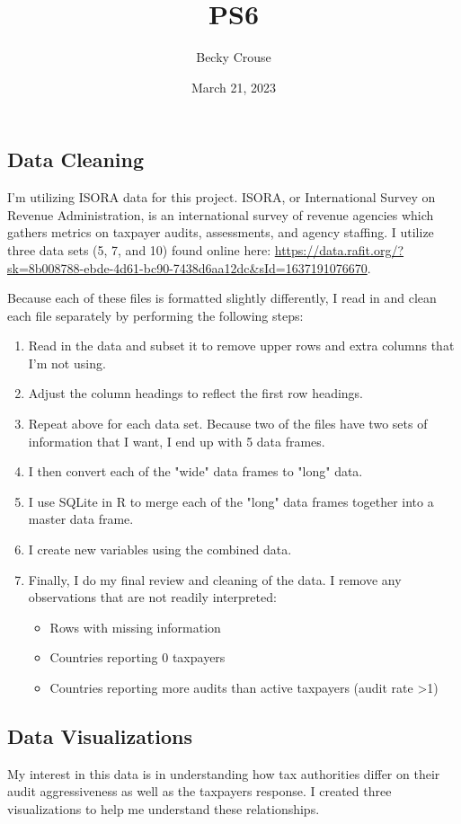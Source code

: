 \documentclass[nobib]{MSword}
\title{PS6}
\author{Becky Crouse}
\date{March 21, 2023}
\begin{document}
\maketitle

\subsection*{Data Cleaning}
I'm utilizing ISORA data for this project. ISORA, or International Survey on Revenue Administration, is an international survey of revenue agencies which gathers metrics on taxpayer audits, assessments, and agency staffing. I utilize three data sets (5, 7, and 10) found online here: \url{https://data.rafit.org/?sk=8b008788-ebde-4d61-bc90-7438d6aa12dc&sId=1637191076670}. 

Because each of these files is formatted slightly differently, I read in and clean each file separately by performing the following steps:
\begin{enumerate}
  \item Read in the data and subset it to remove upper rows and extra columns that I'm not using.
  \item Adjust the column headings to reflect the first row headings.
  \item Repeat above for each data set. Because two of the files have two sets of information that I want, I end up with 5 data frames.
  \item I then convert each of the "wide" data frames to "long" data.
  \item I use SQLite in R to merge each of the "long" data frames together into a master data frame.
  \item I create new variables using the combined data.
  \item Finally, I do my final review and cleaning of the data. I remove any observations that are not readily interpreted: 
  \begin{itemize}
      \item Rows with missing information
      \item Countries reporting 0 taxpayers
      \item Countries reporting more audits than active taxpayers (audit rate >1)
  \end{itemize}
\end{enumerate}

\subsection*{Data Visualizations}
My interest in this data is in understanding how tax authorities differ on their audit aggressiveness as well as the taxpayers response. I created three visualizations to help me understand these relationships. 
\end{document}
